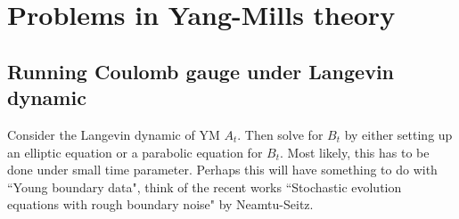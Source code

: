 \documentclass[./main.tex]{subfiles}
\begin{document}
\section{Problems in Yang-Mills theory}
\subsection{Running Coulomb gauge under Langevin dynamic}
Consider the Langevin dynamic of YM $A_t$. Then solve for $B_t$ by either setting up an elliptic equation or a parabolic equation for $B_t$. Most likely, this has to be done under small time parameter. Perhaps this will have something to do with ``Young boundary data", think of the recent works ``Stochastic evolution equations with rough boundary noise" by Neamtu-Seitz. 
\end{document}
